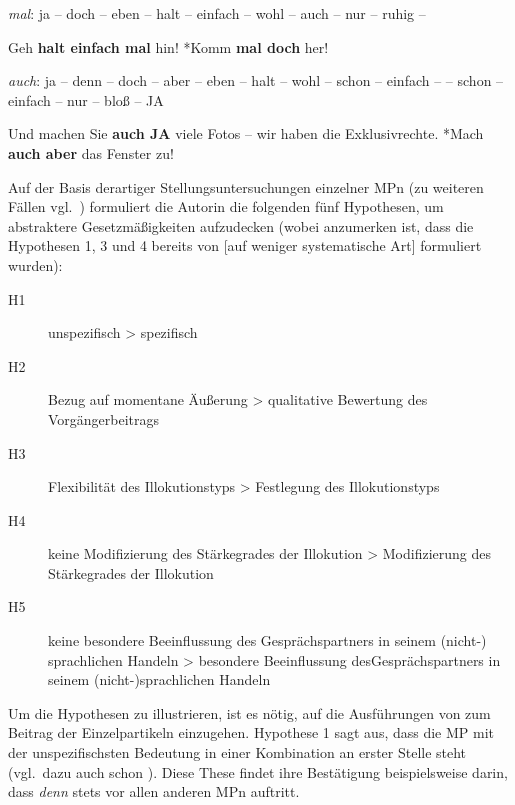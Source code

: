 \begin{exe}
	\ex\label{34} \textit{mal}: ja – doch – eben – halt – einfach – wohl – auch – nur – ruhig –  
		\begin{xlist}	
			\ex\label{34a} Geh \textbf{halt einfach mal} hin!
			\ex\label{34b} *Komm \textbf{mal doch} her!
		\end{xlist}
\end{exe}
	
\begin{exe}
	\ex\label{35} \textit{auch}: ja – denn – doch – aber – eben – halt – wohl – schon – einfach –  – schon
 			– einfach – nur – bloß – JA	 
		\begin{xlist}	
			\ex\label{35a} Und machen Sie \textbf{auch JA} viele Fotos – wir haben die Exklusivrechte.
			\ex\label{35b} *Mach \textbf{auch aber }das Fenster zu! 
			\hfill\hbox{\citet[286/288/287]{Thurmair1989}}
		\end{xlist}
\end{exe}															  
Auf der Basis derartiger Stellungsuntersuchungen einzelner MPn (zu weiteren Fällen vgl.\ \citealt[285--288]{Thurmair1989}) formuliert die Autorin die folgenden fünf Hypothesen, um abstraktere Gesetzmäßigkeiten aufzudecken (wobei anzumerken ist, dass die Hypothesen 1, 3 und 4 bereits von \citealt{Dahl1988} [auf weniger systematische Art] formuliert wurden):

\begin{exe}
	\ex
\begin{description}
	\item[H1] unspezifisch > spezifisch
	\item[H2] Bezug auf momentane Äußerung > qualitative Bewertung des Vorgän\-gerbeitrags	
	\item[H3] Flexibilität des Illokutionstyps > Festlegung des Illokutionstyps
	\item[H4] keine Modifizierung des Stärkegrades der Illokution > Modifizierung des Stärkegrades der Illokution
	\item[H5] keine besondere Beeinflussung des Gesprächspartners in seinem \linebreak (nicht-)
sprachlichen Handeln > besondere Beeinflussung des\linebreak Gesprächspartners in seinem (nicht-)sprachlichen Handeln  
\end{description}
\end{exe}
Um die Hypothesen zu illustrieren, ist es nötig, auf die Ausführungen von \citet{Thurmair1989} zum Beitrag der Einzelpartikeln einzugehen. Hypothese 1 sagt aus, dass die MP mit der unspezifischsten Bedeutung in einer Kombination an erster Stelle steht (vgl.\ dazu auch schon \citealt[225, 238, 242, 255, 265]{Dahl1988}). Diese These findet ihre Bestätigung beispielsweise darin, dass \textit{denn} stets vor allen anderen MPn auftritt.

